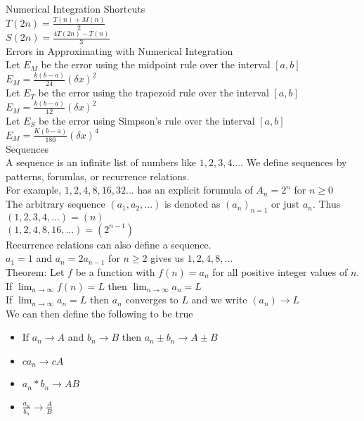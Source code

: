 \documentclass{article}
\begin{document}
\noindent
\Large
Numerical Integration Shortcuts\\
\normalsize
\indent
$T(2n) = \frac{T(n) + M(n)}{2}$\\
$S(2n) = \frac{4T(2n) - T(n)}{3}$\\

\noindent
\Large
Errors in Approximating with Numerical Integration\\
\normalsize
\indent
Let $E_M$ be the error using the midpoint rule over the interval $[a, b]$\\
$E_M = \frac{k(b-a)}{24}(\delta x)^2$\\
Let $E_T$ be the error using the trapezoid rule over the interval $[a, b]$\\
$E_M = \frac{k(b-a)}{12}(\delta x)^2$\\
Let $E_S$ be the error using Simpson's rule over the interval $[a, b]$\\
$E_M = \frac{K(b-a)}{180}(\delta x)^4$\\

\noindent
\Large
Sequences\\
\normalsize
\indent
A sequence is an infinite list of numbers like $1, 2, 3, 4 ...$. We define sequences by patterns, forumlas, or recurrence relations.\\
For example, $1, 2, 4, 8, 16, 32 ...$ has an explicit forumula of $A_n = 2^n$ for $n \geq 0$\\
The arbitrary sequence $(a_1, a_2, ...)$ is denoted as $(a_n)_{n=1}$ or just $a_n$. Thus\\
$(1, 2, 3, 4, ...) = (n)$\\
$(1, 2, 4, 8, 16, ...) = (2^{n-1})$\\
Recurrence relations can also define a sequence.\\
$a_1 = 1$ and $a_n = 2a_{n-1}$ for $n \geq 2$ gives us $1, 2, 4, 8, ...$\\
Theorem: Let $f$ be a function with $f(n) = a_n$ for all positive integer values of $n$. If $\lim_{n \to \infty} f(n) = L$ then $\lim_{n \to \infty} a_n = L$\\
If $\lim_{n \to \infty} a_n = L$ then $a_n$ converges to $L$ and we write $(a_n) \to L$\\
We can then define the following to be true
\begin{itemize}
  \item If $a_n \to A$ and $b_n \to B$ then $a_n \pm b_n \to A \pm B$
  \item $ca_n \to cA$
  \item $a_n * b_n \to AB$
  \item $\frac{a_n}{b_n} \to \frac{A}{B}$
\end{itemize}
\end{document}
